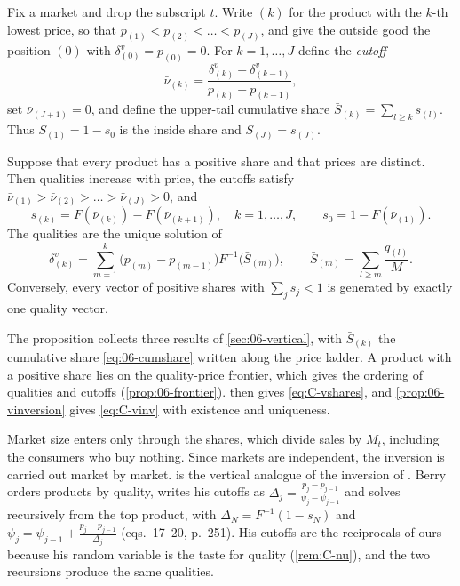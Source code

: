 Fix a market and drop the subscript $t$. Write $(k)$ for the product with the $k$-th lowest price, so that
$p_{(1)} < p_{(2)} < \dots < p_{(J)}$, and give the outside good the position $(0)$ with $\delta^v_{(0)} = p_{(0)} = 0$.
For $k = 1, \dots, J$ define the \emph{cutoff}
\begin{equation}\label{eq:C-vcut}
  \bar\nu_{(k)} = \frac{\delta^v_{(k)} - \delta^v_{(k-1)}}{p_{(k)} - p_{(k-1)}},
\end{equation}
set $\bar\nu_{(J+1)} = 0$, and define the upper-tail cumulative share $\bar S_{(k)} = \sum_{l \ge k} s_{(l)}$. Thus
$\bar S_{(1)} = 1 - s_0$ is the inside share and $\bar S_{(J)} = s_{(J)}$.

\begin{proposition}\label{prop:C-vinv}
Suppose that every product has a positive share and that prices are distinct. Then qualities increase with price,
the cutoffs satisfy $\bar\nu_{(1)} > \bar\nu_{(2)} > \dots > \bar\nu_{(J)} > 0$, and
\begin{equation}\label{eq:C-vshares}
  s_{(k)} = F(\bar\nu_{(k)}) - F(\bar\nu_{(k+1)}), \quad k = 1, \dots, J, \qquad s_0 = 1 - F(\bar\nu_{(1)}).
\end{equation}
The qualities are the unique solution of
\begin{equation}\label{eq:C-vinv}
  \delta^v_{(k)} = \sum_{m=1}^{k}\big(p_{(m)} - p_{(m-1)}\big)F^{-1}\big(\bar S_{(m)}\big),
  \qquad \bar S_{(m)} = \sum_{l \ge m}\frac{q_{(l)}}{M}.
\end{equation}
Conversely, every vector of positive shares with $\sum_j s_j < 1$ is generated by exactly one quality vector.
\end{proposition}

The proposition collects three results of \cref{sec:06-vertical}, with $\bar S_{(k)}$ the cumulative share
\eqref{eq:06-cumshare} written along the price ladder. A product with a positive share lies on the quality-price
frontier, which gives the ordering of qualities and cutoffs (\cref{prop:06-frontier}).  then
gives \eqref{eq:C-vshares}, and \cref{prop:06-vinversion} gives \eqref{eq:C-vinv} with existence and uniqueness.

Market size enters only through the shares, which divide sales by $M_t$, including the consumers who buy nothing.
Since markets are independent, the inversion is carried out market by market.  is the vertical
analogue of the inversion of \citet{Berry1994}. Berry orders products by quality, writes his cutoffs as
$\Delta_j = \frac{p_j - p_{j-1}}{\psi_j - \psi_{j-1}}$ and solves recursively from the top product, with
$\Delta_N = F^{-1}(1 - s_N)$ and $\psi_j = \psi_{j-1} + \frac{p_j - p_{j-1}}{\Delta_j}$ (eqs.~17--20, p.~251). His
cutoffs are the reciprocals of ours because his random variable is the taste for quality (\cref{rem:C-nu}), and the
two recursions produce the same qualities.

